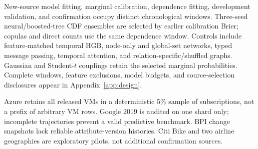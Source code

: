 New-source model fitting, marginal calibration, dependence fitting, development
validation, and confirmation occupy distinct chronological windows. Three-seed
neural/boosted-tree CDF ensembles are selected by earlier calibration Brier;
copulas and direct counts use the same dependence window. Controls include
feature-matched temporal HGB, node-only and global-set networks, typed message
passing, temporal attention, and relation-specific/shuffled graphs. Gaussian
and Student-$t$ couplings retain the selected marginal probabilities. Complete
windows, feature exclusions, model budgets, and source-selection disclosures
appear in Appendix~\ref{app:design}.

Azure retains all released VMs in a deterministic 5\% sample of subscriptions,
not a prefix of arbitrary VM rows. Google 2019 is audited on one shard only;
incomplete trajectories prevent a valid predictive benchmark. BPI change
snapshots lack reliable attribute-version histories. Citi Bike and two airline
geographies are exploratory pilots, not additional confirmation sources.
